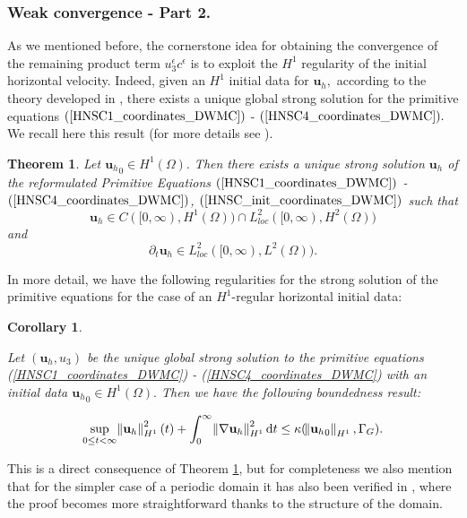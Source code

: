 \documentclass[12pt]{report}
\newtheorem{theorem}{Theorem}
\numberwithin{theorem}{chapter}
\newtheorem{corollary}{Corollary}
\numberwithin{corollary}{chapter}
\numberwithin{lemma}{chapter}
\numberwithin{remark}{chapter}
\numberwithin{definition}{chapter}
\numberwithin{prop}{chapter}
\newcommand*\diff{\mathop{}\!\mathrm{d}}
\begin{document}
\subsubsection{Weak convergence - Part 2.}
  
As we mentioned before, the cornerstone idea for obtaining the convergence of the remaining product term $u_3^\epsilon c^\epsilon$ is to exploit the $H^1$ regularity of the initial horizontal velocity. Indeed, given an $H^1$ initial data for $\mathbf{u}_h,$ according to the theory developed in \cite{cao2007global}, there exists a unique global strong solution for the primitive equations $(\ref{HNSC1_coordinates_DWMC})$ - $(\ref{HNSC4_coordinates_DWMC}).$ We recall here this result (for more details see \cite{cao2007global}).
  
  \begin{theorem} \label{PE3DWellPosedness}
    Let ${\mathbf{u}_h}_0 \in H^1(\Omega).$ Then there exists a unique strong solution $\mathbf{u}_h$ of the reformulated Primitive Equations $(\ref{HNSC1_coordinates_DWMC})$ - $(\ref{HNSC4_coordinates_DWMC})$, $(\ref{HNSC_init_coordinates_DWMC})$ such that $$\mathbf{u}_h \in C([0, \infty), H^1(\Omega)) \cap L^2_{loc}([0, \infty), H^2(\Omega))$$ and $$\partial_t \mathbf{u}_h \in L^2_{loc} ([0,\infty), L^2(\Omega)).$$
  \end{theorem}
  
In more detail, we have the following regularities for the strong solution of the primitive equations for the case of an $H^1$-regular horizontal initial data:
  
  \begin{corollary} \label{StrongSolPE_boundedness}
  
    Let $(\mathbf{u}_h,u_3)$ be the unique global strong solution to the primitive equations (\ref{HNSC1_coordinates_DWMC}) - (\ref{HNSC4_coordinates_DWMC}) with an initial data ${\mathbf{u}_h}_0 \in H^1(\Omega).$ Then we have the following boundedness result:
    
    $$ \sup_{0 \leq t < \infty} \norm{\mathbf{u}_h}_{H^1}^2 (t) + \int_0^\infty \norm{\nabla \mathbf{u}_h}_{H^1}^2 \diff t \leq \kappa (\norm{{\mathbf{u}_h}_0}_{H^1}, \Gamma_G).$$
  
  \end{corollary}
  
This is a direct consequence of Theorem \ref{PE3DWellPosedness}, but for completeness we also mention that for the simpler case of a periodic domain it has also been verified in \cite{li2019primitive}, where the proof becomes more straightforward thanks to the structure of the domain.
  
\end{document}
